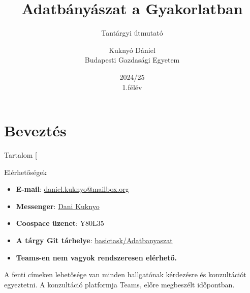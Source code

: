 \documentclass[english, aspectratio=169]{beamer}
\makeatletter
\newcommand\makebeamertitle{\frame{\maketitle}}
\let\origtableofcontents=\tableofcontents
\def\tableofcontents{\@ifnextchar[{\origtableofcontents}{\gobbletableofcontents}}
\def\gobbletableofcontents#1{\origtableofcontents}
\makeatother
\begin{document}
	
\section{Beveztés}
\title[]{Adatbányászat a Gyakorlatban}
\subtitle{Tantárgyi útmutató}
\author[Kuknyó Dániel]{Kuknyó Dániel\\Budapesti Gazdasági Egyetem}
\date{2024/25\\1.félév}
\makebeamertitle

\begin{frame}{Tartalom}
\tableofcontents{}
\end{frame}

\begin{frame}{Elérhetőségek}
\begin{center}
\begin{itemize}
	\item \textbf{E-mail}: \href{mailto:daniel.kuknyo@mailbox.org}{daniel.kuknyo@mailbox.org}
	\item \textbf{Messenger}: \href{https://www.facebook.com/dani.kkny/}{Dani Kuknyo}
	\item \textbf{Coospace üzenet}: Y80L35
	\item \textbf{A tárgy Git tárhelye}: \href{https://github.com/basictask/Adatbanyaszat}{basictask/Adatbanyaszat}
	\item \textbf{Teams-en nem vagyok rendszeresen elérhető.} 
\end{itemize}
\end{center}
A fenti címeken lehetősége van minden hallgatónak kérdezésre és konzultációt egyeztetni. A konzultáció platformja Teams, előre megbeszélt időpontban.
\end{frame}
\end{document}
